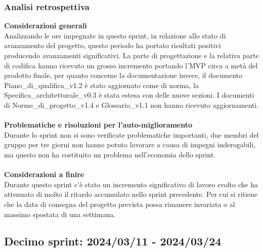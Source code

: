 \newpage
\subsubsection{Analisi retrospettiva}
\textbf{Considerazioni generali}\\
Analizzando le ore impegnate in questo sprint, in relazione allo stato di avanzamento del progetto, questo periodo ha portato risultati positivi producendo avanzamenti significativi. La parte di progettazione e la relativa parte di codifica hanno ricevuto un grosso incremento portando l'MVP circa a metà del prodotto finale, per quanto concerne la documentazione invece, il documento Piano\_di\_qualifica\_v1.2 è stato aggiornato come di norma, la Specifica\_architetturale\_v0.3 è stata estesa con delle nuove sezioni. I documenti di Norme\_di\_progetto\_v1.4 e Glossario\_v1.1 non hanno ricevuto aggiornamenti.
\\ \\
\textbf{Problematiche e risoluzioni per l'auto-miglioramento}\\
Durante lo sprint non si sono verificate problematiche importanti, due membri del gruppo per tre giorni non hanno potuto lavorare a causa di impegni inderogabili, ma questo non ha costituito un problema nell'economia dello sprint.
\\ \\
\textbf{Considerazioni a finire}\\
Durante questo sprint c'è stato un incremento significativo di lavoro svolto che ha attenuato di molto il ritardo accumulato nello sprint precedente. Per cui si ritiene che la data di consegna del progetto prevista possa rimanere invariata o al massimo spostata di una settimana.


\newpage
\subsection{Decimo sprint: 2024/03/11 - 2024/03/24}
